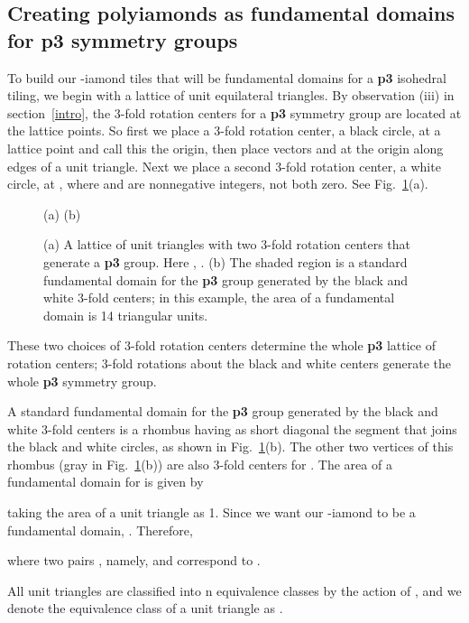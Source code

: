 \documentclass{ws-ijcga}
\begin{document}
\subsection{Creating polyiamonds as fundamental domains for {\bf p3} symmetry groups}
\label{p3:create}
To build our -iamond tiles that will be fundamental domains for a {\bf p3} isohedral tiling, we begin
with a lattice of unit equilateral triangles. 
By observation (iii) in section~\ref{intro}, 
the 3-fold rotation centers for a {\bf p3} symmetry group are located at the lattice points. 
So first we place a 3-fold
rotation center, a black circle, at a lattice point and call this the origin, then place vectors 
 and 
at the origin along edges of a unit triangle. 
Next we place a second 3-fold rotation center, a
white circle, at , where  and  are nonnegative integers, 
not both zero. See Fig.~\ref{fig:p3}(a).
\begin{figure}[h]
\centerline{
}
\centerline{(a) \hspace{2.1cm} (b)}
\vspace*{8pt}
\caption{
(a) A lattice of unit triangles with two 3-fold rotation centers that generate a {\bf p3} group. 
Here , . 
(b) The shaded region is a standard fundamental domain for the {\bf p3} group generated by the black and white
3-fold centers; in this example, the area of a fundamental domain is 14 triangular units.
\label{fig:p3}
}
\end{figure}
These two choices of 3-fold rotation centers determine the whole {\bf p3} lattice of rotation centers; 
3-fold rotations about the black and white centers generate the whole {\bf p3} symmetry group.

A standard fundamental domain for the {\bf p3} group  generated by the black and white 3-fold
centers is a  rhombus having as short diagonal the segment that joins the black and white
circles, as shown in Fig.~\ref{fig:p3}(b). The other two vertices of this rhombus (gray in Fig.~\ref{fig:p3}(b)) are also
3-fold centers for . The area  of a fundamental domain for  is given by

taking the area of a unit triangle as 1. 
Since we want our -iamond to be a fundamental
domain, . Therefore,

where two pairs , namely,  and  correspond to .

All unit triangles are classified into n equivalence classes by the action of , and we denote
the equivalence class of a unit triangle  as .
\end{document}
